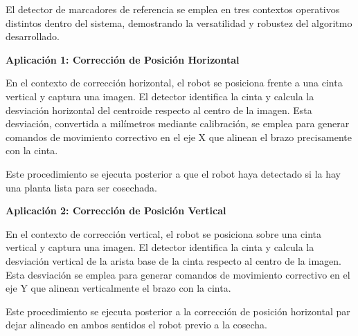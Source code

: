 El detector de marcadores de referencia se emplea en tres contextos operativos distintos dentro del sistema, demostrando la versatilidad y robustez del algoritmo desarrollado.

\textbf{Aplicación 1: Corrección de Posición Horizontal}

En el contexto de corrección horizontal, el robot se posiciona frente a una cinta vertical y captura una imagen. El detector identifica la cinta y calcula la desviación horizontal del centroide respecto al centro de la imagen. Esta desviación, convertida a milímetros mediante calibración, se emplea para generar comandos de movimiento correctivo en el eje X que alinean el brazo precisamente con la cinta.

Este procedimiento se ejecuta posterior a que el robot haya detectado si la hay una planta lista para ser cosechada.

\textbf{Aplicación 2: Corrección de Posición Vertical}

En el contexto de corrección vertical, el robot se posiciona sobre una cinta vertical y captura una imagen. El detector identifica la cinta y calcula la desviación vertical de la arista base de la cinta respecto al centro de la imagen. Esta desviación se emplea para generar comandos de movimiento correctivo en el eje Y que alinean verticalmente el brazo con la cinta.

Este procedimiento se ejecuta posterior a la corrección de posición horizontal par dejar alineado en ambos sentidos el robot previo a la cosecha.

